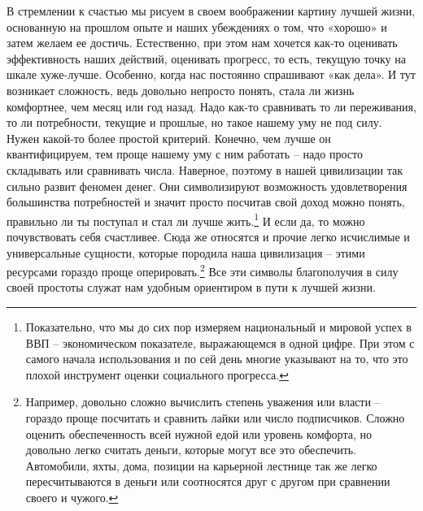 \documentclass[12pt,a4paper]{report}
\begin{document}
\noindent В стремлении к счастью мы рисуем в своем воображении картину лучшей жизни, основанную на прошлом опыте и наших убеждениях о том, что «хорошо» и затем желаем ее достичь. Естественно, при этом нам хочется как-то оценивать эффективность наших действий, оценивать прогресс, то есть, текущую точку на шкале хуже-лучше. Особенно, когда нас постоянно спрашивают «как дела». И тут возникает сложность, ведь довольно непросто понять, стала ли жизнь комфортнее, чем месяц или год назад. Надо как-то сравнивать то ли переживания, то ли потребности, текущие и прошлые, но такое нашему уму не под силу. Нужен какой-то более простой критерий. Конечно, чем лучше он квантифицируем, тем проще нашему уму с ним работать -- надо просто складывать или сравнивать числа. Наверное, поэтому в нашей цивилизации так сильно развит феномен денег. Они символизируют возможность удовлетворения большинства потребностей и значит просто посчитав свой доход можно понять, правильно ли ты поступал и стал ли лучше жить.\footnote{Показательно, что мы до сих пор измеряем национальный и мировой успех в ВВП -- экономическом показателе, выражающемся в одной цифре. При этом с самого начала использования и по сей день многие указывают на то, что это плохой инструмент оценки социального прогресса.} И если да, то можно почувствовать себя счастливее. Сюда же относятся и прочие легко исчислимые и универсальные сущности, которые породила наша цивилизация -- этими ресурсами гораздо проще оперировать.\footnote{Например, довольно сложно вычислить степень уважения или власти -- гораздо проще посчитать и сравнить лайки или число подписчиков. Сложно оценить обеспеченность всей нужной едой или уровень комфорта, но довольно легко считать деньги, которые могут все это обеспечить. Автомобили, яхты, дома, позиции на карьерной лестнице так же легко пересчитываются в деньги или соотносятся друг с другом при сравнении своего и чужого.} Все эти символы благополучия в силу своей простоты служат нам удобным ориентиром в пути к лучшей жизни.
\end{document}
